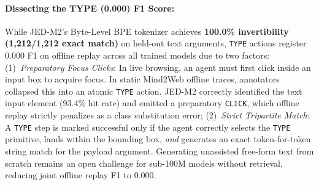 \documentclass[10pt,twocolumn,letterpaper]{article}
\begin{document}
\begin{table}[t]
\centering
\small
{}
\caption{\textbf{Action Primitive F1 Breakdown.} Evaluated on the 11-episode held-out test split.}
\label{tab:actions}
\end{table}

\paragraph{Dissecting the TYPE (0.000) F1 Score:} While JED-M2's Byte-Level BPE tokenizer achieves \textbf{100.0\% invertibility (1,212/1,212 exact match)} on held-out text arguments, \texttt{TYPE} actions register 0.000 F1 on offline replay across all trained models due to two factors: (1)~\textit{Preparatory Focus Clicks}: In live browsing, an agent must first click inside an input box to acquire focus. In static Mind2Web offline traces, annotators collapsed this into an atomic \texttt{TYPE} action. JED-M2 correctly identified the text input element (93.4\% hit rate) and emitted a preparatory \texttt{CLICK}, which offline replay strictly penalizes as a class substitution error; (2)~\textit{Strict Tripartite Match}: A \texttt{TYPE} step is marked successful only if the agent correctly selects the \texttt{TYPE} primitive, lands within the bounding box, \textit{and} generates an exact token-for-token string match for the payload argument. Generating unassisted free-form text from scratch remains an open challenge for sub-100M models without retrieval, reducing joint offline replay F1 to 0.000.
\end{document}
